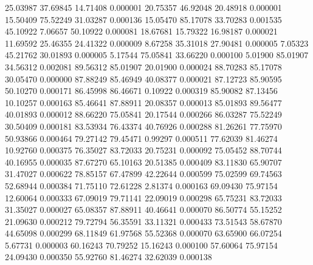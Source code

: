        25.03987       37.69845       14.71408       0.000001
       20.75357       46.92048       20.48918       0.000001
       15.50409       75.52249       31.03287       0.000136
       15.05470       85.17078       33.70283       0.001535
       45.10922        7.06657       50.10922       0.000081
       18.67681       15.79322       16.98187       0.000021
       11.69592       25.46355       24.41322       0.000009
	8.67258       35.31018       27.90481       0.000005
	7.05323       45.21762       30.01893       0.000005
	5.17544       75.05841       33.66220       0.000100
	5.01900       85.01907       34.56312       0.002081
       89.56312       85.01907       20.01900       0.000024
       88.70283       85.17078       30.05470       0.000000
       87.88249       85.46949       40.08377       0.000021
       87.12723       85.90595       50.10270       0.000171
       86.45998       86.46671        0.10922       0.000319
       85.90082       87.13456       10.10257       0.000163
       85.46641       87.88911       20.08357       0.000013
       85.01893       89.56477       40.01893       0.000012
       88.66220       75.05841       20.17544       0.000266
       86.03287       75.52249       30.50409       0.000181
       83.53934       76.43374       40.76926       0.000288
       81.26261       77.75970       50.93866       0.000464
       79.27142       79.45471        0.99297       0.000511
       77.62039       81.46274       10.92760       0.000375
       76.35027       83.72033       20.75231       0.000092
       75.05452       88.70744       40.16955       0.000035
       87.67270       65.10163       20.51385       0.000409
       83.11830       65.90707       31.47027       0.000622
       78.85157       67.47899       42.22644       0.000599
       75.02599       69.74563       52.68944       0.000384
       71.75110       72.61228        2.81374       0.000163
       69.09430       75.97154       12.60064       0.000333
       67.09019       79.71141       22.09019       0.000298
       65.75231       83.72033       31.35027       0.000027
       65.08357       87.88911       40.46641       0.000070
       86.50774       55.15252       21.09630       0.000212
       79.72794       56.35591       33.11321       0.000433
       73.51543       58.67870       44.65098       0.000299
       68.11849       61.97568       55.52368       0.000070
       63.65900       66.07254        5.67731       0.000003
       60.16243       70.79252       15.16243       0.000100
       57.60064       75.97154       24.09430       0.000350
       55.92760       81.46274       32.62039       0.000138
